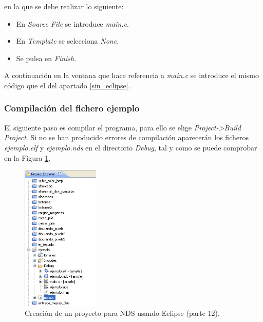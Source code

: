 \noindent en la que se debe realizar lo siguiente:
\begin{itemize}
 	\item En \textit{Source File} se introduce \textit{main.c}.
 	\item En \textit{Template} se selecciona \textit{None}.
 	\item Se pulsa en \textit{Finish}.
\end{itemize}

A continuación en la ventana que hace referencia a \textit{main.c} se introduce el mismo código que el del apartado \ref{sin_eclipse}.

\subsubsection{Compilación del fichero ejemplo}
El siguiente paso es compilar el programa, para ello se elige \textit{Project->Build Project}. Si no se han producido errores de compilación aparecerán los ficheros  \textit{ejemplo.elf} y \textit{ejemplo.nds} en el directorio \textit{Debug}, tal y como se puede comprobar en la Figura \ref{fig_c2_ficheros_eclipse}.

\begin{figure}[t]
	\centering
	\includegraphics[height=7cm]{./Figuras/C2/c2_ficheros_eclipse.png}
	\caption{Creación de un proyecto para NDS usando Eclipse  (parte 12).}
	\label{fig_c2_ficheros_eclipse}
\end{figure}

